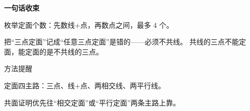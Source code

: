 \documentclass{exam-zh}
\begin{document}
\begin{eduDualExplain}
  \begin{eduExplainLeft}
  \end{eduExplainLeft}

  \begin{eduExplainRight}
    \vspace{1mm}
    {\color{edu-blue}\bfseries\small 一句话收束}\par\vspace{1mm}
    \begin{eduBulletList}
      \item 枚举定面个数：先数线+点，再数点之间，最多 $4$ 个。    \end{eduBulletList}
  \end{eduExplainRight}
\end{eduDualExplain}




\begin{eduMistakeBox}
把“三点定面”记成“任意三点定面”是错的——必须不共线。
共线的三点不能定面，能定面的是不共线的三点。
\end{eduMistakeBox}




\begin{eduSummaryBlock}{\eduIconPin}{方法提醒}
\begin{eduBulletList}
  \item 定面四主路：三点、线+点、两相交线、两平行线。  \item 共面证明优先往“相交定面”或“平行定面”两条主路上靠。\end{eduBulletList}
\end{eduSummaryBlock}



\clearpage
{}
\end{document}
